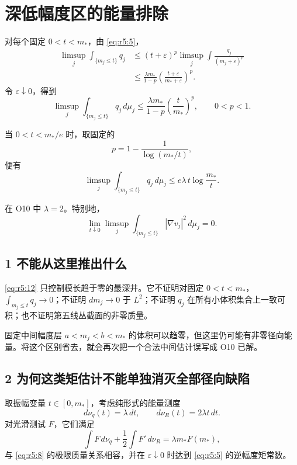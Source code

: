 \documentclass[UTF8,11pt,fontset=none]{ctexart}
\begin{document}
\section{深低幅度区的能量排除}\label{ch5:ux6df1ux4f4eux5e45ux5ea6ux533aux7684ux80fdux91cfux6392ux9664}

对每个固定 \(0<t<m_*\)，由 \eqref{eq:r5:5}， \[
 \begin{aligned}
 \limsup_j\int_{\{m_j\le t\}}q_j
 &\le (t+\varepsilon)^p
       \limsup_j\int\frac{q_j}{(m_j+\varepsilon)^p}\\
 &\le\frac{\lambda m_*}{1-p}
       \left(\frac{t+\varepsilon}{m_*+\varepsilon}\right)^p.
 \end{aligned}
\] 令 \(\varepsilon\downarrow0\)，得到 \[
 \boxed{
 \limsup_j\int_{\{m_j\le t\}}q_j\,d\mu_j
 \le\frac{\lambda m_*}{1-p}\left(\frac t{m_*}\right)^p,
 \qquad 0<p<1.
 }
\tag{5.10}\label{eq:r5:10}
\]

当 \(0<t<m_*/e\) 时，取固定的 \[
 p=1-\frac1{\log(m_*/t)},
\] 便有 \[
 \boxed{
 \limsup_j\int_{\{m_j\le t\}}q_j\,d\mu_j
 \le e\lambda\,t\log\frac{m_*}{t}.
 }
\tag{5.11}\label{eq:r5:11}
\]

在 O10 中 \(\lambda=2\)。特别地， \[
 \lim_{t\downarrow0}\limsup_j
 \int_{\{m_j\le t\}}|\nabla v_j|^2\,d\mu_j=0.
\tag{5.12}\label{eq:r5:12}
\]

\subsection{1 不能从这里推出什么}\label{ch5:ux4e0dux80fdux4eceux8fd9ux91ccux63a8ux51faux4ec0ux4e48}

\eqref{eq:r5:12} 只控制模长趋于零的最深井。它不证明对固定 \(0<t<m_*\)，\(\int_{m_j\le t}q_j\to0\)；不证明 \(dm_j\to0\) 于 \(L^2\)；不证明 \(q_j\) 在所有小体积集合上一致可积；也不证明第五线丛截面的非零质量。

固定中间幅度层 \(a<m_j<b<m_*\) 的体积可以趋零，但这里仍可能有非零径向能量。将这个区别省去，就会再次把一个合法中间估计误写成 O10 已解。

\subsection{2 为何这类矩估计不能单独消灭全部径向缺陷}\label{ch5:ux4e3aux4f55ux8fd9ux7c7bux77e9ux4f30ux8ba1ux4e0dux80fdux5355ux72ecux6d88ux706dux5168ux90e8ux5f84ux5411ux7f3aux9677}

取振幅变量 \(t\in[0,m_*]\)，考虑纯形式的能量测度 \[
 d\nu_q(t)=\lambda\,dt,\qquad d\nu_R(t)=2\lambda t\,dt.
\tag{5.13}\label{eq:r5:13}
\] 对光滑测试 \(F\)，它们满足 \[
 \int F\,d\nu_q+\frac12\int F'\,d\nu_R
 =\lambda m_* F(m_*),
\] 与 \eqref{eq:r5:8} 的极限质量关系相容，并在 \(\varepsilon\downarrow0\) 时达到 \eqref{eq:r5:5} 的逆幅度矩常数。
\end{document}
